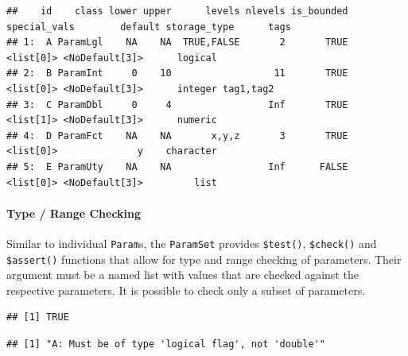 \documentclass[]{scrbook}
\newenvironment{Shaded}{\begin{snugshade}}{\end{snugshade}}
\newcommand{\DataTypeTok}[1]{\textcolor[rgb]{0.13,0.29,0.53}{#1}}
\newcommand{\DecValTok}[1]{\textcolor[rgb]{0.00,0.00,0.81}{#1}}
\newcommand{\KeywordTok}[1]{\textcolor[rgb]{0.13,0.29,0.53}{\textbf{#1}}}
\newcommand{\NormalTok}[1]{#1}
\newcommand{\OperatorTok}[1]{\textcolor[rgb]{0.81,0.36,0.00}{\textbf{#1}}}
\newcommand{\OtherTok}[1]{\textcolor[rgb]{0.56,0.35,0.01}{#1}}
\let\oldparagraph\paragraph
\renewcommand{\paragraph}[1]{\oldparagraph{#1}\mbox{}}
\renewenvironment{Shaded} {\begin{snugshade}\small} {\end{snugshade}}
\begin{document}
\begin{verbatim}
##    id    class lower upper      levels nlevels is_bounded special_vals        default storage_type      tags
## 1:  A ParamLgl    NA    NA  TRUE,FALSE       2       TRUE    <list[0]> <NoDefault[3]>      logical          
## 2:  B ParamInt     0    10                  11       TRUE    <list[0]> <NoDefault[3]>      integer tag1,tag2
## 3:  C ParamDbl     0     4                 Inf       TRUE    <list[1]> <NoDefault[3]>      numeric          
## 4:  D ParamFct    NA    NA       x,y,z       3       TRUE    <list[0]>              y    character          
## 5:  E ParamUty    NA    NA                 Inf      FALSE    <list[0]> <NoDefault[3]>         list
\end{verbatim}

\hypertarget{type-range-checking-1}{%
\paragraph{Type / Range Checking}\label{type-range-checking-1}}

Similar to individual \texttt{Param}s, the \texttt{ParamSet} provides \texttt{\$test()}, \texttt{\$check()} and \texttt{\$assert()} functions that allow for type and range checking of parameters.
Their argument must be a named list with values that are checked against the respective parameters.
It is possible to check only a subset of parameters.

\begin{Shaded}
\end{Shaded}

\begin{verbatim}
## [1] TRUE
\end{verbatim}

\begin{Shaded}
\end{Shaded}

\begin{verbatim}
## [1] "A: Must be of type 'logical flag', not 'double'"
\end{verbatim}
\end{document}
